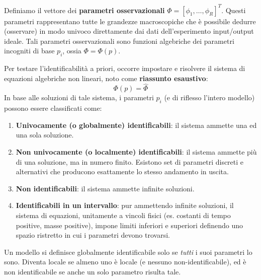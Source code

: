 Definiamo il vettore dei \textbf{parametri osservazionali} $\Phi = [\phi_1, \dots, \phi_R]^T$. Questi parametri rappresentano tutte le grandezze macroscopiche che è possibile dedurre (osservare) in modo univoco direttamente dai dati dell'esperimento input/output ideale. Tali parametri osservazionali sono funzioni algebriche dei parametri incogniti di base $p_i$, ossia $\Phi = \Phi(p)$.

Per testare l'identificabilità a priori, occorre impostare e risolvere il sistema di equazioni algebriche non lineari, noto come \textbf{riassunto esaustivo}:
\begin{equation}
\Phi(p) = \hat{\Phi}
\end{equation}
In base alle soluzioni di tale sistema, i parametri $p_i$ (e di riflesso l'intero modello) possono essere classificati come:
\begin{enumerate}
    \item \textbf{Univocamente (o globalmente) identificabili}: il sistema ammette una ed una sola soluzione.
    \item \textbf{Non univocamente (o localmente) identificabili}: il sistema ammette più di una soluzione, ma in numero finito. Esistono set di parametri discreti e alternativi che producono esattamente lo stesso andamento in uscita.
    \item \textbf{Non identificabili}: il sistema ammette infinite soluzioni.
    \item \textbf{Identificabili in un intervallo}: pur ammettendo infinite soluzioni, il sistema di equazioni, unitamente a vincoli fisici (es. costanti di tempo positive, masse positive), impone limiti inferiori e superiori definendo uno spazio ristretto in cui i parametri devono trovarsi.
\end{enumerate}
Un modello si definisce globalmente identificabile solo se \textit{tutti} i suoi parametri lo sono. Diventa locale se almeno uno è locale (e nessuno non-identificabile), ed è non identificabile se anche un solo parametro risulta tale.


